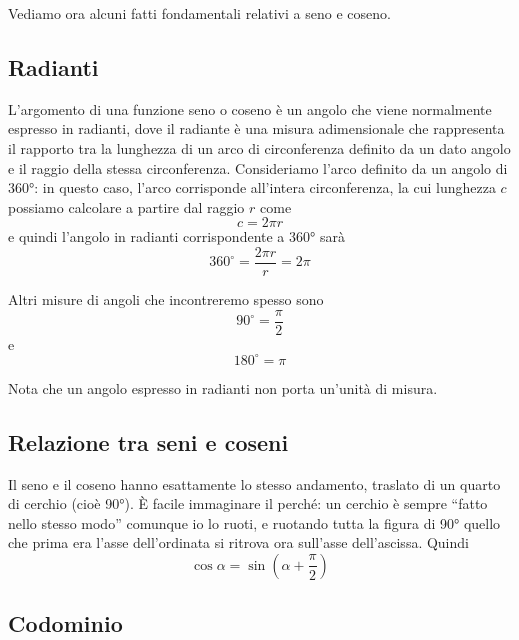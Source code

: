 Vediamo ora alcuni fatti fondamentali relativi a seno e coseno.

\subsection{Radianti}

L'argomento di una funzione seno o coseno è un angolo che viene normalmente espresso in radianti, dove il radiante è una misura adimensionale che rappresenta il rapporto tra la lunghezza di un arco di circonferenza definito da un dato angolo e il raggio della stessa circonferenza. Consideriamo l'arco definito da un angolo di 360°: in questo caso, l'arco corrisponde all'intera circonferenza, la cui lunghezza $c$ possiamo calcolare a partire dal raggio $r$ come
\begin{equation}
c = 2 \pi r
\end{equation}
e quindi l'angolo in radianti corrispondente a 360° sarà
\begin{equation}
360^{\circ} = \frac{2 \pi r}{r} = 2 \pi
\end{equation}

Altri misure di angoli che incontreremo spesso sono
\begin{equation}
90^{\circ} = \frac{\pi}{2}
\end{equation}
e
\begin{equation}
180^{\circ} = \pi
\end{equation}

Nota che un angolo espresso in radianti non porta un'unità di misura.


\subsection{Relazione tra seni e coseni}

Il seno e il coseno hanno esattamente lo stesso andamento, traslato di un quarto di cerchio (cioè 90°). È facile immaginare il perché: un cerchio è sempre ``fatto nello stesso modo'' comunque io lo ruoti, e ruotando tutta la figura di 90° quello che prima era l'asse dell'ordinata si ritrova ora sull'asse dell'ascissa. Quindi
\begin{equation}
\cos \alpha = \sin(\alpha + \frac{\pi}{2})
\end{equation}


\subsection{Codominio}

